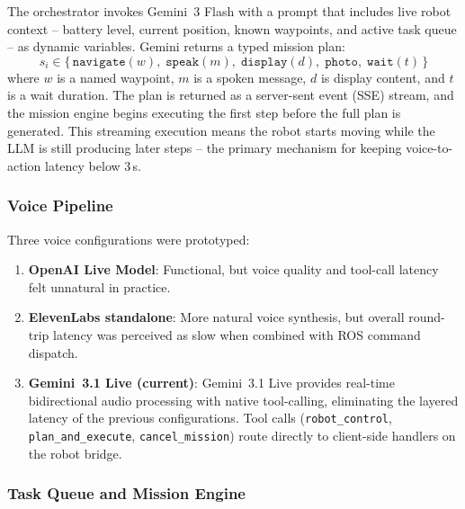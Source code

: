 The orchestrator invokes Gemini~3 Flash with a prompt that includes live robot context -- battery level, current position, known waypoints, and active task queue -- as dynamic variables. Gemini returns a typed mission plan:
\begin{equation}
  s_i \in \{\,\texttt{navigate}(w),\;\texttt{speak}(m),\;\texttt{display}(d),\;\texttt{photo},\;\texttt{wait}(t)\,\}
\end{equation}
where $w$ is a named waypoint, $m$ is a spoken message, $d$ is display content, and $t$ is a wait duration. The plan is returned as a server-sent event (SSE) stream, and the mission engine begins executing the first step before the full plan is generated. This streaming execution means the robot starts moving while the LLM is still producing later steps -- the primary mechanism for keeping voice-to-action latency below 3\,s.

\subsubsection{Voice Pipeline}

Three voice configurations were prototyped:
\begin{enumerate}
  \item \textbf{OpenAI Live Model}: Functional, but voice quality and tool-call latency felt unnatural in practice.
  \item \textbf{ElevenLabs standalone}: More natural voice synthesis, but overall round-trip latency was perceived as slow when combined with ROS command dispatch.
  \item \textbf{Gemini~3.1 Live (current)}: Gemini~3.1 Live provides real-time bidirectional audio processing with native tool-calling, eliminating the layered latency of the previous configurations. Tool calls (\texttt{robot\_control}, \texttt{plan\_and\_execute}, \texttt{cancel\_mission}) route directly to client-side handlers on the robot bridge.
\end{enumerate}

\subsubsection{Task Queue and Mission Engine}


